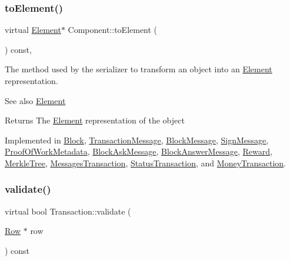 \subsubsection{\texorpdfstring{to\+Element()}{toElement()}}
{\footnotesize\ttfamily virtual \mbox{\hyperlink{classElement}{Element}}$\ast$ Component\+::to\+Element (\begin{DoxyParamCaption}{ }\end{DoxyParamCaption}) const\hspace{0.3cm}{\ttfamily [pure virtual]}, {\ttfamily [inherited]}}

The method used by the serializer to transform an object into an \mbox{\hyperlink{classElement}{Element}} representation. \begin{DoxySeeAlso}{See also}
\mbox{\hyperlink{classElement}{Element}}
\end{DoxySeeAlso}
\begin{DoxyReturn}{Returns}
The \mbox{\hyperlink{classElement}{Element}} representation of the object 
\end{DoxyReturn}


Implemented in \mbox{\hyperlink{classBlock_aa289363a40f0d3ba88720ad0bc71f34f}{Block}}, \mbox{\hyperlink{classTransactionMessage_ae20e7d6a7b5811bb56a32ec6af59b8e2}{Transaction\+Message}}, \mbox{\hyperlink{classBlockMessage_ab47afd5cfb7d6d5c544d8def5d0f9737}{Block\+Message}}, \mbox{\hyperlink{classSignMessage_aee897c4bf78df966b8cca95e589566e4}{Sign\+Message}}, \mbox{\hyperlink{classProofOfWorkMetadata_a2aab4c26afb3a85a712cc065028274d9}{Proof\+Of\+Work\+Metadata}}, \mbox{\hyperlink{classBlockAskMessage_a0bc20076f19423855ab5772003fb65f6}{Block\+Ask\+Message}}, \mbox{\hyperlink{classBlockAnswerMessage_ac7f35ec9f7f2fbcd726628c2a984518b}{Block\+Answer\+Message}}, \mbox{\hyperlink{classReward_a0ecd536148463880f9980fe415b6eb1d}{Reward}}, \mbox{\hyperlink{classMerkleTree_a4e72819c6cbc49ed8ce092f464711a5f}{Merkle\+Tree}}, \mbox{\hyperlink{classMessagesTransaction_a0ef8ec080a2698a02ad8b1b95d243720}{Messages\+Transaction}}, \mbox{\hyperlink{classStatusTransaction_aed42f2d61f2d50ec07bb6b35473f61f2}{Status\+Transaction}}, and \mbox{\hyperlink{classMoneyTransaction_a84adc847266467965014cb04acd48bea}{Money\+Transaction}}.

\mbox{\label{classTransaction_a638518143f0defde1c3c73e33db1b7f1}} 
\subsubsection{\texorpdfstring{validate()}{validate()}}
{\footnotesize\ttfamily virtual bool Transaction\+::validate (\begin{DoxyParamCaption}\item[{\mbox{\hyperlink{classRow}{Row}} $\ast$}]{row }\end{DoxyParamCaption}) const\hspace{0.3cm}{\ttfamily [pure virtual]}}


